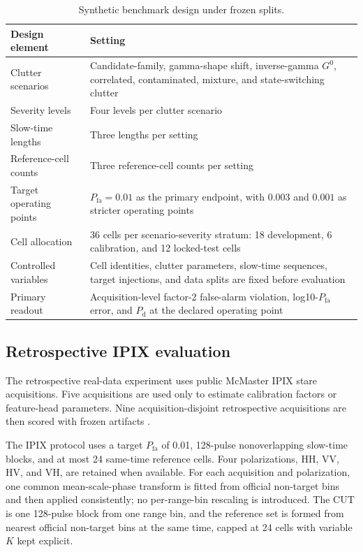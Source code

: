 \documentclass[preprint,12pt]{elsarticle}
\begin{document}
\begin{table}[!htbp]
\centering
\footnotesize
\setlength{\tabcolsep}{4pt}
\renewcommand{\arraystretch}{0.86}
\caption{Synthetic benchmark design under frozen splits.}
\label{tab:synthetic-design}
\begin{tabularx}{\textwidth}{lX}
\toprule
Design element & Setting \\
\midrule
Clutter scenarios & Candidate-family, gamma-shape shift, inverse-gamma $G^0$,
correlated, contaminated, mixture, and state-switching clutter \\
Severity levels & Four levels per clutter scenario \\
Slow-time lengths & Three lengths per setting \\
Reference-cell counts & Three reference-cell counts per setting \\
Target operating points & $P_{\mathrm{fa}}=0.01$ as the primary endpoint, with
$0.003$ and $0.001$ as stricter operating points \\
Cell allocation & 36 cells per scenario-severity stratum: 18 development,
6 calibration, and 12 locked-test cells \\
Controlled variables & Cell identities, clutter parameters, slow-time
sequences, target injections, and data splits are fixed before evaluation \\
Primary readout & Acquisition-level factor-2 false-alarm violation,
log10-$P_{\mathrm{fa}}$ error, and $P_{\mathrm{d}}$ at the declared operating
point \\
\bottomrule
\end{tabularx}
\end{table}
\normalsize
\renewcommand{\arraystretch}{1}
\FloatBarrier

\subsection{Retrospective IPIX evaluation}
\label{subsec:ipix}

The retrospective real-data experiment uses public McMaster IPIX stare
acquisitions. Five acquisitions are used only to estimate calibration factors or
feature-head parameters. Nine acquisition-disjoint retrospective acquisitions
are then scored with frozen artifacts \cite{ipix_dataset,greco2006polarimetric}.

The IPIX protocol uses a target $P_{\mathrm{fa}}$ of 0.01, 128-pulse
nonoverlapping slow-time blocks, and at most 24 same-time reference cells.
Four polarizations, HH, VV, HV, and VH, are retained when available. For each
acquisition and polarization, one common mean-scale-phase transform is fitted
from official non-target bins and then applied consistently; no per-range-bin
rescaling is introduced. The CUT is one 128-pulse block from one range bin, and
the reference set is formed from nearest official non-target bins at the same
time, capped at 24 cells with variable $K$ kept explicit.
\end{document}
